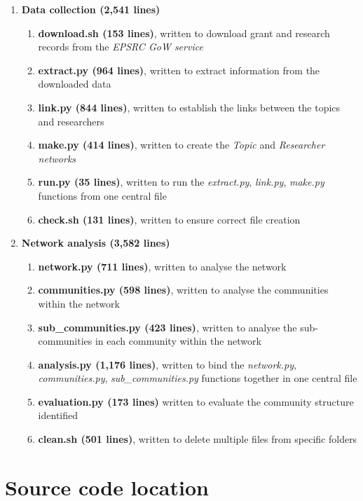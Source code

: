 \begin{enumerate}[itemsep=0cm, label*=\arabic*.]
    \item \textbf{Data collection (2,541 lines)}
\begin{enumerate}[itemsep=0cm, label*=\arabic*.]
    \item \textbf{download.sh (153 lines)}, written to download grant and research records from the \textit{EPSRC GoW service}
    \item \textbf{extract.py (964 lines)}, written to extract information from the downloaded data
    \item \textbf{link.py (844 lines)}, written to establish the links between the topics and researchers
    \item \textbf{make.py (414 lines)}, written to create the \textit{Topic} and \textit{Researcher networks}
    \item \textbf{run.py (35 lines)}, written to run the \textit{extract.py}, \textit{link.py}, \textit{make.py} functions from one central file
    \item \textbf{check.sh (131 lines)}, written to ensure correct file creation
\end{enumerate}
    \item \textbf{Network analysis (3,582 lines)}
\begin{enumerate}[itemsep=0cm, label*=\arabic*.]
    \item \textbf{network.py (711 lines)}, written to analyse the network
    \item \textbf{communities.py (598 lines)}, written to analyse the communities within the network
    \item \textbf{sub\_communities.py (423 lines)}, written to analyse the sub-communities in each community within the network
    \item \textbf{analysis.py (1,176 lines)}, written to bind the \textit{network.py}, \textit{communities.py}, \textit{sub\_communities.py} functions together in one central file
    \item \textbf{evaluation.py (173 lines)} written to evaluate the community structure identified
    \item \textbf{clean.sh (501 lines)}, written to delete multiple files from specific folders
\end{enumerate}
\end{enumerate}

\section{Source code location}

